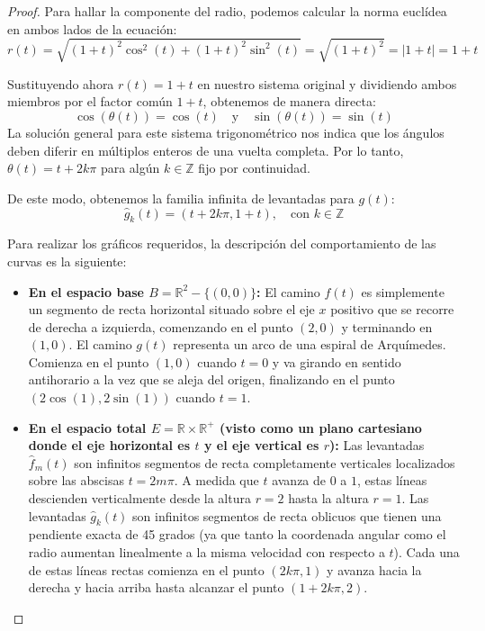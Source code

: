 \documentclass{article}
\theoremstyle{plain}
\theoremstyle{definition}
\newcommand{\R}{\mathbb{R}}
\begin{document}
\begin{proof}
    Para hallar la componente del radio, podemos calcular la norma euclídea en ambos lados de la ecuación:
    \[ r(t) = \sqrt{{(1+t)}^2\cos^2(t) + {(1+t)}^2\sin^2(t)} = \sqrt{{(1+t)}^2} = |1+t| = 1+t \]

    Sustituyendo ahora \( r(t) = 1+t \) en nuestro sistema original y dividiendo ambos miembros por el factor común \( 1+t \), obtenemos de manera directa:
    \[ \cos(\theta(t)) = \cos(t) \quad \text{y} \quad \sin(\theta(t)) = \sin(t) \]
    La solución general para este sistema trigonométrico nos indica que los ángulos deben diferir en múltiplos enteros de una vuelta completa. Por lo tanto, \( \theta(t) = t + 2k\pi \) para algún \( k \in \mathbb{Z} \) fijo por continuidad.

    De este modo, obtenemos la familia infinita de levantadas para \( g(t) \):
    \[ \hat{g}_k(t) = (t + 2k\pi, 1+t), \quad \text{con } k \in \mathbb{Z} \]

    Para realizar los gráficos requeridos, la descripción del comportamiento de las curvas es la siguiente:
    \begin{itemize}
        \item \textbf{En el espacio base \( B = \R^2 - \{(0,0)\} \):}
              El camino \( f(t) \) es simplemente un segmento de recta horizontal situado sobre el eje \( x \) positivo que se recorre de derecha a izquierda, comenzando en el punto \( (2,0) \) y terminando en \( (1,0) \).
              El camino \( g(t) \) representa un arco de una espiral de Arquímedes. Comienza en el punto \( (1,0) \) cuando \( t=0 \) y va girando en sentido antihorario a la vez que se aleja del origen, finalizando en el punto \( (2\cos(1), 2\sin(1)) \) cuando \( t=1 \).

        \item \textbf{En el espacio total \( E = \R \times \R^{+} \) (visto como un plano cartesiano donde el eje horizontal es \( t \) y el eje vertical es \( r \)):}
              Las levantadas \( \hat{f}_m(t) \) son infinitos segmentos de recta completamente verticales localizados sobre las abscisas \( t = 2m\pi \). A medida que \( t \) avanza de \( 0 \) a \( 1 \), estas líneas descienden verticalmente desde la altura \( r=2 \) hasta la altura \( r=1 \).
              Las levantadas \( \hat{g}_k(t) \) son infinitos segmentos de recta oblicuos que tienen una pendiente exacta de 45 grados (ya que tanto la coordenada angular como el radio aumentan linealmente a la misma velocidad con respecto a \( t \)). Cada una de estas líneas rectas comienza en el punto \( (2k\pi, 1) \) y avanza hacia la derecha y hacia arriba hasta alcanzar el punto \( (1+2k\pi, 2) \).
    \end{itemize}
\end{proof}
\end{document}
